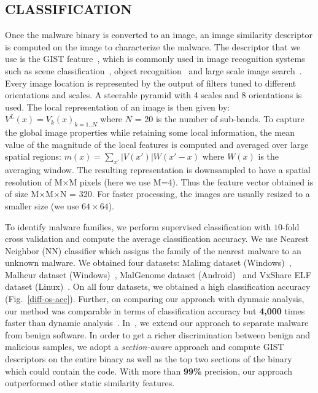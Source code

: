 \documentclass[journal]{IEEEtran}
\begin{document}
\subsection*{CLASSIFICATION}
 Once the malware binary is converted to an image, an image similarity descriptor is computed on the image to characterize the malware. 
The descriptor that we use is the GIST feature~\cite{gist2}, which is commonly used in image recognition systems such as scene classification~\cite{gist2}, object recognition~\cite{gist1} and large scale image search~\cite{gist-eval}. 
Every image location is represented by the output of filters tuned to different orientations
and scales. 
A steerable pyramid with 4 scales and 8 orientations is used.
The local representation of an image is then given by: $V^{L}(x) = {V_{k}(x)}_{k=1..N}$ where $N$ = 20 is the number of sub-bands.
To capture the global image properties while retaining some local information, the mean value of the magnitude of the local features is computed and averaged over large spatial regions: $m(x) = \sum_{x'} | V(x') | W(x'-x) $ where $W(x)$ is the averaging window. 
The resulting representation is downsampled to have a spatial resolution of M$\times$M pixels (here we use M=4).
Thus the feature vector obtained is of size M$\times$M$\times$N = 320. 
For faster processing, the images are usually resized to a smaller size (we use $64 \times 64$).

 To identify malware families, we perform supervised classification with $10$-fold cross validation and compute the average classification accuracy.
We use Nearest Neighbor (NN) classifier which assigns the family of the nearest malware to an unknown malware. 
We obtained four datasets: Malimg dataset (Windows)~\cite{malimg-ds}, Malheur dataset (Windows)~\cite{malheur}, MalGenome dataset (Android)~\cite{malgenome} and VxShare ELF dataset (Linux)~\cite{vxshare}.
On all four datasets, we obtained a high classification accuracy (Fig.~\ref{diff-os-acc}).
Further, on comparing our approach with dynmaic analysis, our method was comparable in terms of classification accuracy but {\bf 4,000} times faster than dynamic analysis~\cite{comp-assm}.  
In~\cite{sigmal}, we extend our approach to separate malware from benign software.
In order to get a richer discrimination between benign and malicious samples, we adopt a \emph{section-aware} approach and compute GIST descriptors on the entire binary as well as the top two sections of the binary which could contain the code. 
With more than {\bf 99\%} precision, our approach outperformed other static similarity features.
\end{document}
